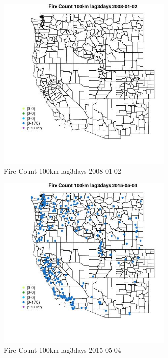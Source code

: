 \begin{figure} 
\centering  
\includegraphics[width=0.77\textwidth]{Code_Outputs/Report_ML_input_PM25_Step4_part_e_de_duplicated_aves_compiled_2019-05-18wNAs_MapObsFire_Count_100km_lag3days2008-01-02.jpg} 
\caption{\label{fig:Report_ML_input_PM25_Step4_part_e_de_duplicated_aves_compiled_2019-05-18wNAsMapObsFire_Count_100km_lag3days2008-01-02}Fire Count 100km lag3days 2008-01-02} 
\end{figure} 
 

\begin{figure} 
\centering  
\includegraphics[width=0.77\textwidth]{Code_Outputs/Report_ML_input_PM25_Step4_part_e_de_duplicated_aves_compiled_2019-05-18wNAs_MapObsFire_Count_100km_lag3days2015-05-04.jpg} 
\caption{\label{fig:Report_ML_input_PM25_Step4_part_e_de_duplicated_aves_compiled_2019-05-18wNAsMapObsFire_Count_100km_lag3days2015-05-04}Fire Count 100km lag3days 2015-05-04} 
\end{figure} 
 

